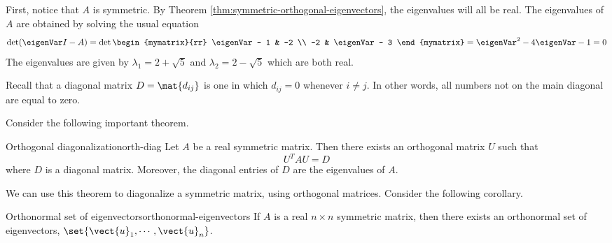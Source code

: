\begin{solution}
First, notice that $A$ is symmetric. By Theorem \ref{thm:symmetric-orthogonal-eigenvectors}, the eigenvalues will all be real. The eigenvalues of $A$ are obtained by solving the usual equation 
\[
\det (\eigenVar I - A) = 
\det \begin{mymatrix}{rr}
\eigenVar - 1 & -2 \\ 
-2 & \eigenVar - 3 
\end{mymatrix} = \eigenVar^2 -4\eigenVar -1=0
\]
The eigenvalues are given by $\lambda_1 =2+
\sqrt{5}$ and $\lambda_2 =2-\sqrt{5}$ which are both real. 
\end{solution}

Recall that a diagonal matrix $D=\mat{d_{ij} }$ is one in which $d_{ij} = 0$ whenever $i \neq j$. In other words, all numbers not on the main diagonal are equal to zero. 

Consider the following important theorem.

\begin{theorem}{Orthogonal diagonalization}{orth-diag}
Let $A$ be a real symmetric matrix. Then there exists an
orthogonal matrix $U$ such that 
\[
U^{T}AU = D
\]
where $D$ is a diagonal matrix. Moreover,
the diagonal entries of $D$ are the eigenvalues of $A$.
\end{theorem}

We can use this theorem to diagonalize a symmetric matrix, using orthogonal matrices. Consider the following corollary.

\begin{corollary}{Orthonormal set of eigenvectors}{orthonormal-eigenvectors}
If $A$ is a real $n\times n$ symmetric matrix, then there exists an
orthonormal set of eigenvectors, $\set{\vect{u}_{1},\cdots ,\vect{u}
_{n}} $.
\end{corollary}

